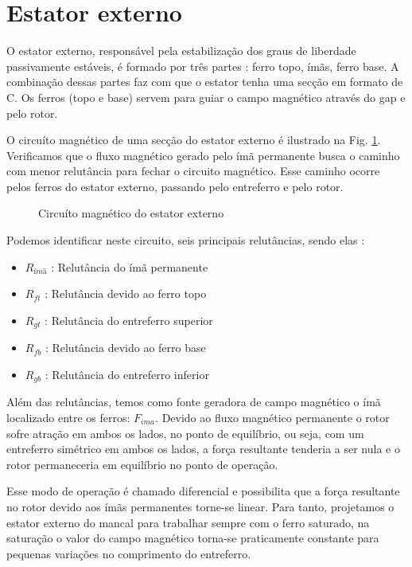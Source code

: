 \section{Estator externo}\label{cap:mancal:estator:externo}

O estator externo, responsável pela estabilização dos graus de liberdade passivamente estáveis, é formado por três partes : ferro topo, ímãs, ferro base. A combinação dessas partes faz com que o estator tenha uma secção em formato de C. Os ferros (topo e base) servem para guiar o campo magnético através do gap e pelo rotor. 

O circuíto magnético de uma secção do estator externo é ilustrado na Fig. \ref{Fig:mancal:circuito:passivo}. Verificamos que o fluxo magnético gerado pelo ímã permanente busca o caminho com menor relutância para fechar o circuito magnético. Esse caminho ocorre pelos ferros do estator externo, passando pelo entreferro e  pelo rotor.

\begin{figure}[!ht]
	\centering
	\def\svgwidth{1\columnwidth}
	
	\caption{Circuíto magnético do estator externo}
	\label{Fig:mancal:circuito:passivo}
\end{figure}

Podemos identificar neste circuito, seis principais relutâncias, sendo elas :

\begin{itemize}
	\item $R_{ímã}$ : Relutância do ímã permanente
	\item $R_{ft}$ : Relutância devido ao ferro topo
	\item $R_{gt}$ : Relutância do entreferro superior
	\item $R_{fb}$ : Relutância devido ao ferro base
	\item $R_{gb}$ : Relutância do entreferro inferior	
\end{itemize}

Além das relutâncias, temos como fonte geradora de campo magnético o ímã localizado entre os ferros: $F_{ima}$. Devido ao fluxo magnético permanente o rotor sofre atração em ambos os lados, no ponto de equilíbrio, ou seja, com um entreferro simétrico em ambos os lados, a força resultante tenderia a ser nula e o rotor permaneceria em equilíbrio no ponto de operação. 

Esse modo de operação é chamado diferencial e possibilita que a força resultante no rotor devido aos ímãs permanentes torne-se linear. Para tanto, projetamos o estator externo do mancal para trabalhar sempre com o ferro saturado, na saturação o valor do campo magnético torna-se praticamente constante para pequenas variações no comprimento do entreferro.

